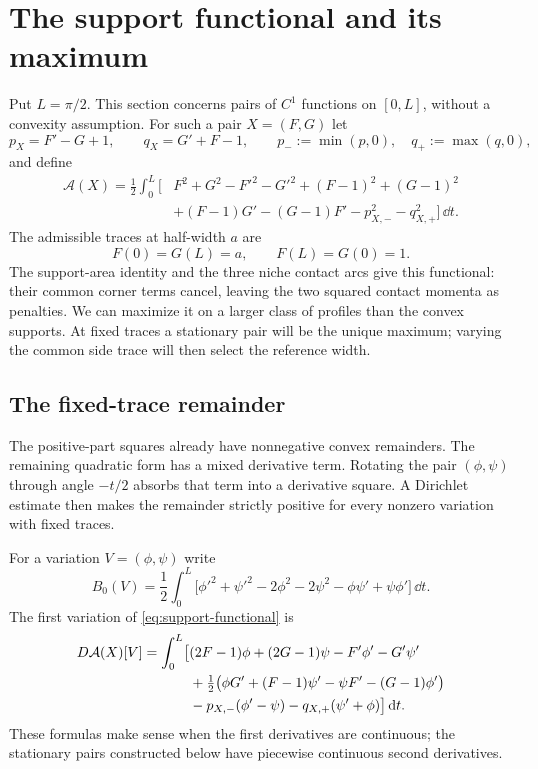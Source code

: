 \section{The support functional and its maximum}\label{sec:calibration}

Put $L=\pi/2$. This section concerns pairs of $C^1$ functions on
$[0,L]$, without a convexity assumption. For such a pair $X=(F,G)$ let
\[
 p_X=F'-G+1,\qquad q_X=G'+F-1,
 \qquad p_-:=\min(p,0),\quad q_+:=\max(q,0),
\]
and define
\begin{equation}\label{eq:support-functional}
 \begin{split}
 \mathcal A(X)=\frac12\int_0^L\bigl[&F^2+G^2-F'^2-G'^2
                  +(F-1)^2+(G-1)^2\\
       &+(F-1)G'-(G-1)F'-p_{X,-}^2-q_{X,+}^2\bigr]\,\dd t.
 \end{split}
\end{equation}
The admissible traces at half-width $a$ are
\begin{equation}\label{eq:calibration-traces}
 F(0)=G(L)=a,\qquad F(L)=G(0)=1.
\end{equation}
The support-area identity and the three niche contact arcs give this
functional: their common corner terms cancel, leaving the two squared
contact momenta as penalties. We can maximize it on a larger class of
profiles than the convex supports. At fixed traces a stationary pair
will be the unique maximum; varying the common side trace will then
select the reference width.

\subsection{The fixed-trace remainder}

The positive-part squares already have nonnegative convex remainders.
The remaining quadratic form has a mixed derivative term. Rotating the
pair $(\phi,\psi)$ through angle $-t/2$ absorbs that term into a
derivative square. A Dirichlet estimate then makes the remainder
strictly positive for every nonzero variation with fixed traces.

For a variation $V=(\phi,\psi)$ write
\[
 B_0(V)=\frac12\int_0^L
 \bigl[\phi'^2+\psi'^2-2\phi^2-2\psi^2
                      -\phi\psi'+\psi\phi'\bigr]\,\dd t.
\]
The first variation of \cref{eq:support-functional} is
\begin{align}\label{eq:calibration-first-variation}
 D\mathcal A(X)[V]=\int_0^L\bigl[&
 (2F-1)\phi+(2G-1)\psi-F'\phi'-G'\psi'\notag\\
 &+\tfrac12\bigl(\phi G'+(F-1)\psi'
                       -\psi F'-(G-1)\phi'\bigr)\notag\\
 &-p_{X,-}(\phi'-\psi)-q_{X,+}(\psi'+\phi)\bigr]\,\mathrm{d} t.
\end{align}
These formulas make sense when the first derivatives are continuous;
the stationary pairs constructed below have piecewise continuous
second derivatives.

